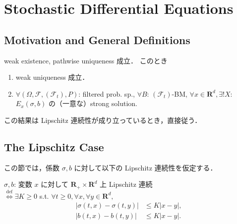 \documentclass{jsarticle}
\title{}
\author{}
\date{
}
\begin{document}
\setcounter{section}{7}
\section{Stochastic Differential Equations}
\subsection{Motivation and General Definitions}

\begin{screen}
    \begin{thm*}
        weak existence, pathwise uniqueness 成立．
        このとき
        \begin{enumerate}[label=(\roman*)]
            \item
            weak uniqueness 成立．
            \item
            $\forall (\Omega, \mathcal{F}, (\mathcal{F}_t), P)$: filtered prob. sp., $\forall B$: $(\mathcal{F}_t)$-BM, $\forall x\in\mathbf{R}^d, \exists! X$: $E_x(\sigma, b)$ の（一意な）strong solution.
        \end{enumerate}
    \end{thm*}
\end{screen}

この結果は Lipschitz 連続性が成り立っているとき，直接従う．

\subsection{The Lipschitz Case}

この節では，係数 $\sigma, b$ に対して以下の Lipschitz 連続性を仮定する．

\begin{screen}
    \begin{df*}
        $\sigma, b$: 変数 $x$ に対して $\mathbf{R_+}\times\mathbf{R}^d$ 上 Lipschitz 連続 \\
        $\stackrel{\operatorname{def}}{\iff}\exists K\ge0$ s.t. $\forall t\ge0, \forall x, \forall y\in\mathbf{R}^d,$
        \begin{align}
            \left\lvert\sigma(t, x)-\sigma(t, y)\right\rvert
            &\le K\left\lvert x-y\right\rvert, \\
            \left\lvert b(t, x)-b(t, y)\right\rvert
            &\le K\left\lvert x-y\right\rvert.
        \end{align}
    \end{df*}
\end{screen}
\end{document}
